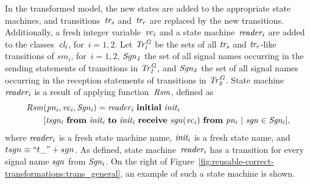 In the transformed model, the new states are added to the appropriate state machines, and transitions~$\it{tr_s}$ and~$\it{tr_r}$ are replaced by the new transitions.
Additionally, a fresh integer variable~$\it{vc_i}$ and a state machine~$\it{reader_i}$ are added to the classes~$\it{cl_i}$, for~$i=1,2$.
Let $\it{Tr^G_i}$ be the sets of all $\it{tr_s}$ and $\it{tr_r}$-like transitions of $sm_i$, for~$i=1,2$,
$\it{Sgn_1}$ the set of all signal names occurring in the sending statements of transitions in $\it{Tr^G_1}$,
and $\it{Sgn_2}$ the set of all signal names occurring in the reception statements of transitions in $\it{Tr^G_2}$.
State machine~$\it{reader_i}$ is a result of applying function~$\it{Rsm}$, defined as
%
\begin{align*}
\it{Rsm} & (\it{pn_i}, \it{vc_i}, \it{Sgn_i}) = \it{reader_i}~\textbf{initial}~\it{init_i} \\
& [\it{tsgn_i}~\textbf{from}~\it{init_i}~\textbf{to}~\it{init_i}~\textbf{receive}~\it{sgn}(\it{vc_i})~\textbf{from}~\it{pn_i}~|~ sgn\in Sgn_i],
\end{align*}
%
\noindent
where $\it{reader_i}$ is a fresh state machine name, $\it{init_i}$ is a fresh state name, and $tsgn \equiv ``t\_"+sgn$.
As defined, state machine~$\it{reader_i}$ has a transition for every signal name $\it{sgn}$ from $\it{Sgn_i}$.
On the right of Figure~\ref{fig:reusable-correct-transformations:trans_general}, an example of such a state machine is shown.
